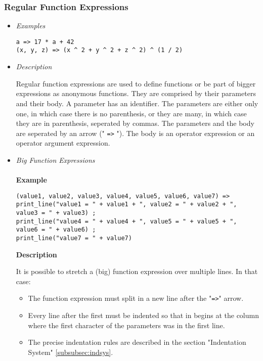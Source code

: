 \documentclass{article}
\begin{document}
\subsubsection{Regular Function Expressions}

\begin{itemize}
\item \textit{Examples}

\begin{verbatim}
a => 17 * a + 42
(x, y, z) => (x ^ 2 + y ^ 2 + z ^ 2) ^ (1 / 2)
\end{verbatim}

\item \textit{Description}

Regular function expressions are used to define functions or be part of bigger
expressions as anonymous functions. They are comprised by their parameters and
their body. A parameter has an identifier. The parameters are either
only one, in which case there is no parenthesis, or they are many, in which
case they are in parenthesis, seperated by commas. The parameters and the body
are seperated by an arrow (" \texttt{=>} "). The body is an operator
expression or an operator argument expression.

\item \textit{Big Function Expressions}\\\\
\textbf{Example}

\begin{verbatim}
(value1, value2, value3, value4, value5, value6, value7) => 
print_line("value1 = " + value1 + ", value2 = " + value2 + ", value3 = " + value3) ;
print_line("value4 = " + value4 + ", value5 = " + value5 + ", value6 = " + value6) ;
print_line("value7 = " + value7)
\end{verbatim}

\textbf{Description}

It is possible to stretch a (big) function expression over multiple lines.
In that case:
\begin{itemize}
\item
The function expression must split in a new line after the "\texttt{=>}" arrow.

\item
Every line after the first must be indented so that in begins at the column 
where the first character of the parameters was in the first line.

\item
The precise indentation rules are described in the section
"Indentation System" \ref{subsubsec:indsys}.
\end{itemize}


\end{itemize}
\end{document}

